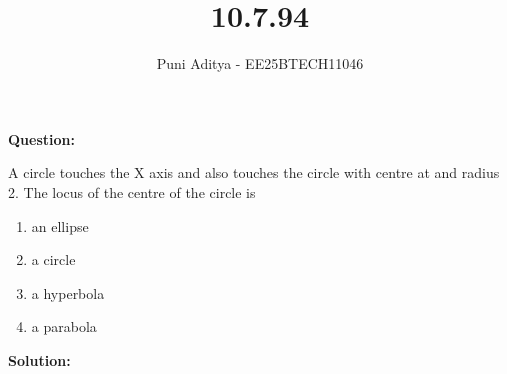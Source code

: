 \documentclass[journal]{IEEEtran}
\begin{document}
\title{10.7.94}
\author{Puni Aditya - EE25BTECH11046}
\maketitle

\textbf{Question:}

A circle touches the X axis and also touches the circle with centre at  and radius 2. The locus of the centre of the circle is
\begin{enumerate}
    \item an ellipse
    \item a circle
    \item a hyperbola
    \item a parabola
\end{enumerate}

\textbf{Solution:}
\end{document}
